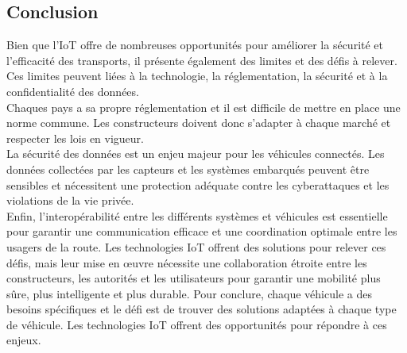 \subsection{Conclusion}
Bien que l’IoT offre de nombreuses opportunités pour améliorer la sécurité et l’efficacité des transports, il présente également des limites et des défis à relever. Ces limites peuvent liées à la technologie, la réglementation, la sécurité et à la confidentialité des données.\\
Chaques pays a sa propre réglementation et il est difficile de mettre en place une norme commune. Les constructeurs doivent donc s'adapter à chaque marché et respecter les lois en vigueur.\\
La sécurité des données est un enjeu majeur pour les véhicules connectés. Les données collectées par les capteurs et les systèmes embarqués peuvent être sensibles et nécessitent une protection adéquate contre les cyberattaques et les violations de la vie privée.\\
Enfin, l'interopérabilité entre les différents systèmes et véhicules est essentielle pour garantir une communication efficace et une coordination optimale entre les usagers de la route. Les technologies IoT offrent des solutions pour relever ces défis, mais leur mise en œuvre nécessite une collaboration étroite entre les constructeurs, les autorités et les utilisateurs pour garantir une mobilité plus sûre, plus intelligente et plus durable.
Pour conclure, chaque véhicule a des besoins spécifiques et le défi est de trouver des solutions adaptées à chaque type de véhicule. Les technologies IoT offrent des opportunités pour répondre à ces enjeux.\\